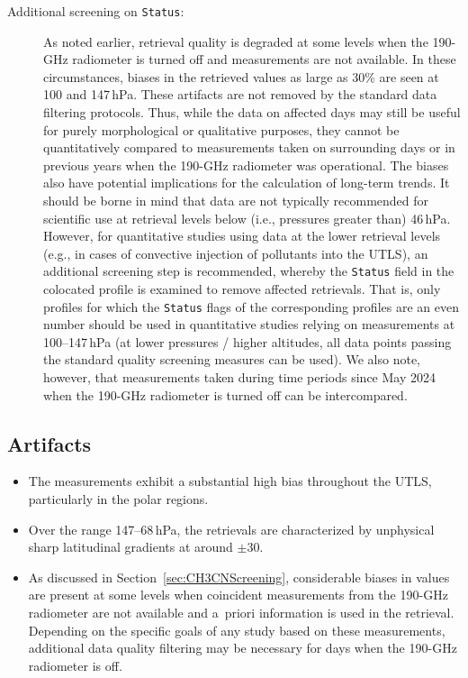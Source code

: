 \begin{nofloatpages}
\begin{description}
  \item[Additional screening on  \texttt{Status}:] As noted earlier,  retrieval quality is degraded at some levels when the \mbox{190\nobreakdash-GHz} radiometer is turned off and  measurements are not available. In these circumstances, biases in the retrieved  values as large as 30\% are seen at 100 and 147\,hPa. These artifacts are not removed by the standard  data filtering protocols. Thus, while the  data on affected days may still be useful for purely morphological or qualitative purposes, they cannot be quantitatively compared to measurements taken on surrounding days or in previous years when the \mbox{190\nobreakdash-GHz} radiometer was operational. The biases also have potential implications for the calculation of long-term trends. It should be borne in mind that  data are not typically recommended for scientific use at retrieval levels below (i.e., pressures greater than) 46\,hPa. However, for quantitative studies using  data at the lower retrieval levels (e.g., in cases of convective injection of pollutants into the UTLS), an additional screening step is recommended, whereby the \texttt{Status} field in the colocated  profile is examined to remove affected  retrievals. That is, only  profiles for which the \texttt{Status} flags of the corresponding  profiles are an even number should be used in quantitative studies relying on  measurements at 100--147\,hPa (at lower pressures / higher altitudes, all  data points passing the standard quality screening measures can be used). We also note, however, that measurements taken during time periods since May 2024 when the \mbox{190\nobreakdash-GHz} radiometer is turned off can be intercompared.
  
\end{description}
\end{nofloatpages}

\subsection{Artifacts}
\begin{itemize}
  \item The measurements exhibit a substantial high bias throughout the UTLS, particularly in the polar regions.
  \item Over the range 147--68\,hPa, the retrievals are characterized by unphysical sharp latitudinal gradients at around $\pm$30\degsym.
  \item As discussed in Section~\ref{sec:CH3CNScreening}, considerable biases in  values are present at some levels when coincident measurements from the \mbox{190\nobreakdash-GHz} radiometer are not available and  a~priori information is used in the  retrieval. Depending on the specific goals of any study based on these measurements, additional  data quality filtering may be necessary for days when the \mbox{190\nobreakdash-GHz} radiometer is off.
\end{itemize}

